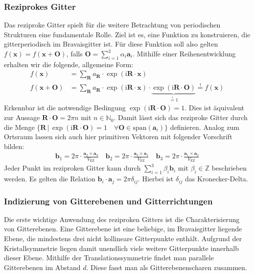 \subsubsection{Reziprokes Gitter}
Das reziproke Gitter spielt für die weitere Betrachtung von periodischen Strukturen eine fundamentale Rolle.
Ziel ist es, eine Funktion zu konstruieren, die gitterperiodisch im Bravaisgitter ist.
Für diese Funktion soll also gelten
$f(\mathbf{x})=f(\mathbf{x}+\mathbf{O})$, falls $\mathbf{O}=\sum_{i=1}^{3} \alpha_{i}\mathbf{a}_{i}$.
Mithilfe einer Reihenentwicklung erhalten wir die folgende, allgemeine Form:
\begin{align*}
    f(\mathbf{x})&=\sum_{\mathbf{R}}a_{\mathbf{R}}\cdot \exp(\mathrm{i}\mathbf{R}\cdot\mathbf{x}) \\
    f(\mathbf{x}+\mathbf{O})&=\sum_{\mathbf{R}}a_{\mathbf{R}}\cdot \exp(\mathrm{i}\mathbf{R}\cdot \mathbf{x})\cdot
    \underbrace{ \exp(\mathrm{i}\mathbf{R}\cdot \mathbf{O}) }_{ \stackrel{!}{=}1 }  \stackrel{!}{=} f(\mathbf{x})
\end{align*}
Erkennbar ist die notwendige Bedingung $\exp(\mathrm{i}\mathbf{R}\cdot \mathbf{O})=1$.
Dies ist äquivalent zur Aussage $\mathbf{R}\cdot \mathbf{O}=2\pi n$ mit $n \in \mathbb{N}_{0}$.
Damit lässt sich das reziproke Gitter durch die Menge
$\{ \mathbf{R} \,\vert\, \exp(\mathrm{i}\mathbf{R}\cdot \mathbf{O})=1 \quad
\forall \mathbf{O} \in \text{span}(\mathbf{a}_{i}) \}$ definieren. \autocite[108]{Ashcroft}
Analog zum Ortsraum lassen sich auch hier primitiven Vektoren mit folgender Vorschrift bilden:
\begin{align*}
    \mathbf{b}_{1} = 2\pi \cdot \frac{\mathbf{a}_{2} \times \mathbf{a}_{3}}{V_{\mathrm{EZ}}} \quad
    \mathbf{b}_{2} = 2\pi \cdot \frac{\mathbf{a}_{3} \times \mathbf{a}_{1}}{V_{\mathrm{EZ}}} \quad
    \mathbf{b}_{3} = 2\pi \cdot \frac{\mathbf{a}_{1} \times \mathbf{a}_{2}}{V_{\mathrm{EZ}}}
\end{align*}
Jeder Punkt im reziproken Gitter kann durch $\sum_{i=1}^{3} \beta_{i}\mathbf{b}_{i}$ mit $\beta_i \in \mathbb{Z}
$ beschrieben werden.
Es gelten die Relation $\mathbf{b}_{i}\cdot \mathbf{a}_{j}=2 \pi \delta_{ij}$.
Hierbei ist $\delta_{ij}$ das Kronecker-Delta.
\autocite[109]{Ashcroft}

\subsubsection{Indizierung von Gitterebenen und Gitterrichtungen}
Die erste wichtige Anwendung des reziproken Gitters ist die Charakterisierung von Gitterebenen.
Eine Gitterebene ist eine beliebige, im Bravaisgitter liegende Ebene, die mindestens drei nicht kollineare Gitterpunkte
enthält.
Aufgrund der Kristallsymmetrie liegen damit unendlich viele weitere Gitterpunkte innerhalb dieser Ebene.
Mithilfe der Translationssymmetrie findet man parallele Gitterebenen im Abstand $d$.
Diese fasst man als Gitterebenenscharen zusammen.

